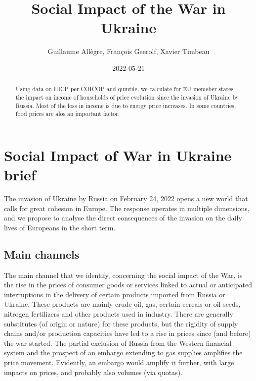 \documentclass[
  9pt,
  a4paper,
  DIV=11,
  numbers=noendperiod,
  oneside]{scrartcl}
\title{Social Impact of the War in Ukraine}
\author{Guillaume Allègre, François Geerolf, Xavier Timbeau}
\date{2022-05-21}
\renewcommand*\contentsname{Table of contents}
\newcommand\contentsname{Table of contents}
\begin{document}
\maketitle
\begin{abstract}
Using data on HICP per COICOP and quintile, we calculate for EU memeber
states the impact on income of households of price evolution since the
invasion of Ukraine by Russia. Most of the loss in income is due to
energy price increases. In some countries, food prices are alos an
important factor.
\end{abstract}
\ifdefined\Shaded\renewenvironment{Shaded}{\begin{tcolorbox}[interior hidden, sharp corners, breakable, frame hidden, enhanced, borderline west={3pt}{0pt}{shadecolor}, boxrule=0pt]}{\end{tcolorbox}}\fi

\renewcommand*\contentsname{Table of contents}
{
\hypersetup{linkcolor=}
\setcounter{tocdepth}{2}
\tableofcontents
}
\hypertarget{social-impact-of-war-in-ukraine-brief}{%
\section{Social Impact of War in Ukraine
brief}\label{social-impact-of-war-in-ukraine-brief}}

The invasion of Ukraine by Russia on February 24, 2022 opens a new world
that calls for great cohesion in Europe. The response operates in
multiple dimensions, and we propose to analyse the direct consequences
of the invasion on the daily lives of Europeans in the short term.

\hypertarget{main-channels}{%
\subsection{Main channels}\label{main-channels}}

The main channel that we identify, concerning the social impact of the
War, is the rise in the prices of consumer goods or services linked to
actual or anticipated interruptions in the delivery of certain products
imported from Russia or Ukraine. These products are mainly crude oil,
gas, certain cereals or oil seeds, nitrogen fertilizers and other
products used in industry. There are generally substitutes (of origin or
nature) for these products, but the rigidity of supply chains and/or
production capacities have led to a rise in prices since (and before)
the war started. The partial exclusion of Russia from the Western
financial system and the prospect of an embargo extending to gas
supplies amplifies the price movement. Evidently, an embargo would
amplify it further, with large impacts on prices, and probably also
volumes (via quotas).
\end{document}
